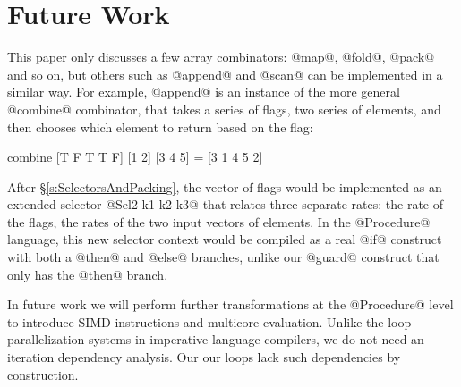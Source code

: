 
\vspace{-1ex}
\section{Future Work}
\label{s:FutureWork}

This paper only discusses a few array combinators: @map@, @fold@, @pack@ and so on, but others such as @append@ and @scan@ can be implemented in a similar way. For example, @append@ is an instance of the more general @combine@ combinator, that takes a series of flags, two series of elements, and then chooses which element to return based on the flag:
\begin{code}
  combine [T F T T F] [1 2] [3 4 5] = [3 1 4 5 2]
\end{code}

After \S\ref{s:SelectorsAndPacking}, the vector of flags would be implemented as an extended selector @Sel2 k1 k2 k3@ that relates three separate rates: the rate of the flags, the rates of the two input vectors of elements. In the @Procedure@ language, this new selector context would be compiled as a real @if@ construct with both a @then@ and @else@ branches, unlike our @guard@ construct that only has the @then@ branch.

In future work we will perform further transformations at the @Procedure@ level to introduce SIMD instructions and multicore evaluation. Unlike the loop parallelization systems in imperative language compilers, we do not need an iteration dependency analysis. Our our loops lack such dependencies by construction.




